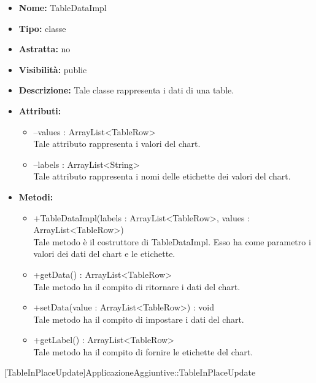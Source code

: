 			
			\begin{itemize}
			\item \textbf{Nome:} TableDataImpl
			\item \textbf{Tipo:} classe
			
		\item \textbf{Astratta:}
		no
			\item \textbf{Visibilità:} public
			\item \textbf{Descrizione:} Tale classe rappresenta i dati di una table.
			\item \textbf{Attributi:}
				\begin{itemize}
				\setlength{\itemsep}{5pt}
				
					\item[\ding{111}] {--values : ArrayList<TableRow>} \\ [1mm] Tale attributo rappresenta i valori del chart.
					\item[\ding{111}] {--labels : ArrayList<String>} \\ [1mm] Tale attributo rappresenta i nomi delle etichette dei valori del chart.
				\end{itemize}
		
			\item \textbf{Metodi:}
				\begin{itemize}
				\setlength{\itemsep}{5pt}
				
					\item[\ding{111}] {{+TableDataImpl(labels : ArrayList<TableRow>, values : ArrayList<TableRow>)}} \\ [1mm] Tale metodo è il costruttore di TableDataImpl. Esso ha come parametro i valori dei dati del chart e le etichette.
					\item[\ding{111}] {{+getData() : ArrayList<TableRow>}} \\ [1mm] Tale metodo ha il compito di ritornare i dati del chart.
					\item[\ding{111}] {{+setData(value : ArrayList<TableRow>) : void}} \\ [1mm] Tale metodo ha il compito di impostare i dati del chart.
					\item[\ding{111}] {{+getLabel() : ArrayList<TableRow>}} \\ [1mm] Tale metodo ha il compito di fornire le etichette del chart.
				\end{itemize}
		
			\end{itemize}
	
			[TableInPlaceUpdate]{ApplicazioneAggiuntive::TableInPlaceUpdate}
			

